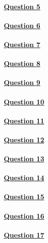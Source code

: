 \paragraph{\ul{Question 5}}
%
\paragraph{\ul{Question 6}}
%
\paragraph{\ul{Question 7}}
%
\paragraph{\ul{Question 8}}
%
\paragraph{\ul{Question 9}}
%
\paragraph{\ul{Question 10}}
%
\paragraph{\ul{Question 11}}
%
\paragraph{\ul{Question 12}}
%
\paragraph{\ul{Question 13}}
%
\paragraph{\ul{Question 14}}
%
\paragraph{\ul{Question 15}}
%
\paragraph{\ul{Question 16}}
%
\paragraph{\ul{Question 17}}
%
%
